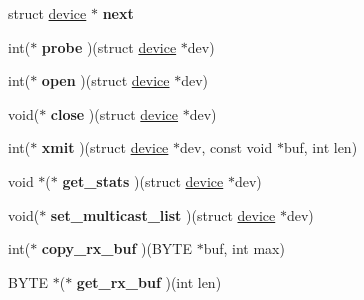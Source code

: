 \begin{DoxyCompactItemize}
\item 
\hypertarget{structdevice_adadf908428f53f867d5fd7af1f0a4678}{
struct \hyperlink{structdevice}{device} $\ast$ {\bfseries next}}
\label{structdevice_adadf908428f53f867d5fd7af1f0a4678}

\item 
\hypertarget{structdevice_a9e1aa3ec6a3f9ec4be5905244b72dc8f}{
int($\ast$ {\bfseries probe} )(struct \hyperlink{structdevice}{device} $\ast$dev)}
\label{structdevice_a9e1aa3ec6a3f9ec4be5905244b72dc8f}

\item 
\hypertarget{structdevice_a0c22ecfde0063b522b8c9630f15e34cc}{
int($\ast$ {\bfseries open} )(struct \hyperlink{structdevice}{device} $\ast$dev)}
\label{structdevice_a0c22ecfde0063b522b8c9630f15e34cc}

\item 
\hypertarget{structdevice_a47a29dc82065410aa95fe82352e2de14}{
void($\ast$ {\bfseries close} )(struct \hyperlink{structdevice}{device} $\ast$dev)}
\label{structdevice_a47a29dc82065410aa95fe82352e2de14}

\item 
\hypertarget{structdevice_aeb643c75e8213e917a1bac8ce915de76}{
int($\ast$ {\bfseries xmit} )(struct \hyperlink{structdevice}{device} $\ast$dev, const void $\ast$buf, int len)}
\label{structdevice_aeb643c75e8213e917a1bac8ce915de76}

\item 
\hypertarget{structdevice_a496769b206e38521176c06aaa0dfab41}{
void $\ast$($\ast$ {\bfseries get\_\-stats} )(struct \hyperlink{structdevice}{device} $\ast$dev)}
\label{structdevice_a496769b206e38521176c06aaa0dfab41}

\item 
\hypertarget{structdevice_ab70f646c9e85a6e1b4efb1c66511c701}{
void($\ast$ {\bfseries set\_\-multicast\_\-list} )(struct \hyperlink{structdevice}{device} $\ast$dev)}
\label{structdevice_ab70f646c9e85a6e1b4efb1c66511c701}

\item 
\hypertarget{structdevice_a479e421367b73712d238d97128c02a1c}{
int($\ast$ {\bfseries copy\_\-rx\_\-buf} )(BYTE $\ast$buf, int max)}
\label{structdevice_a479e421367b73712d238d97128c02a1c}

\item 
\hypertarget{structdevice_ab978cfe058d61fe52eb709bfb7a66d5f}{
BYTE $\ast$($\ast$ {\bfseries get\_\-rx\_\-buf} )(int len)}
\label{structdevice_ab978cfe058d61fe52eb709bfb7a66d5f}


\end{DoxyCompactItemize}
